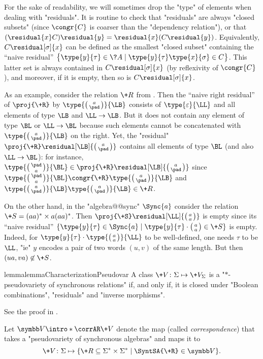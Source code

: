 For the sake of readability, we will sometimes drop the "type" of elements when dealing
with "residuals".
It is routine to check that "residuals" are always "closed subsets" (since $\congr{C}$ is coarser than the "dependency relation"), or that $(\residual{x} C)\residual{y} =
\residual{x} (C\residual{y})$.
Equivalently, $C\residual[\sigma]{x}$ can be defined as the smallest "closed subset"
containing the ``naive residual''
$\bigl\{
	\type{y}{\tau} \in \?A \mid
		\type{y}{\tau}\type{x}{\sigma} \in C
\bigr\}$.
This latter set is always contained in $C\residual[\sigma]{x}$ (by reflexivity of $\congr{C}$),
and moreover, if it is empty, then so is $C\residual[\sigma]{x}$.

As an example, consider the relation $\+R$ from .
Then the ``naive right residual'' of $\proj{\+R}$ by $\type{\pair{a}{\pad}}{\LB}$
consists of $\type{\varepsilon}{\LL}$ and all elements of type $\LB$ and $\LL\to\LB$.
But it does not contain any element of type $\BL$ or $\LL\to\BL$ because such elements cannot be concatenated with $\type{\pair{a}{\pad}}{\LB}$ on the right.
Yet, the "residual" 
$\proj{\+R} \residual[\LB]{\pair{a}{\pad}}$ contains all elements of type $\BL$ (and also $\LL\to\BL$): for instance, $\type{\pair{\pad}{a}}{\BL} \in
\proj{\+R} \residual[\LB]{\pair{a}{\pad}}$ since $\type{\pair{\pad}{a}}{\BL} \congr{\+R} \type{\pair{a}{\pad}}{\LB}$
and $\type{\pair{a}{\pad}}{\LB} \type{\pair{a}{\pad}}{\LB} \in \+R$.

On the other hand, in the "algebra@@sync" $\Sync{a}$ consider the relation
$\+S = (aa)^*\times a(aa)^*$.
Then $\proj{\+S}\residual[\LL]{\pair{a}{a}}$ is empty since its 
``naive residual'' $\{\type{y}{\tau} \in \Sync{a} \mid \type{y}{\tau}\cdot\pair{a}{a} \in \+S\}$
is empty. Indeed, for $\type{y}{\tau}\cdot\type{\pair{a}{a}}{\LL}$ to
be well-defined, one needs $\tau$ to be $\LL$, "ie" $y$ encodes a pair of
two words $(u,v)$ of the same length. But then $(ua, va) \not\in \+S$.

\begin{restatable}{lemma}{lemmaCharacterizationPseudovar}
	\AP\label{lemma:characterization-pseudovarieties-syncrel}
	A class $\+V\colon \Sigma \mapsto \+V_\Sigma$ is a "$\ast$-pseudovariety of synchronous relations" if, and only if, it is closed under "Boolean combinations", "residuals" and
	"inverse morphisms".
\end{restatable}
See the proof in .

Let \AP$\B{V} \intro*\corrAR \+V$ denote the map (called \emph{correspondence}) that takes a 
"pseudovariety of synchronous algebras" and maps it to
\[\+V\colon \Sigma \mapsto \{\+R \subseteq \Sigma^*\times \Sigma^* \mid \SyntSA{\+R} \in \B{V}\}.\]


